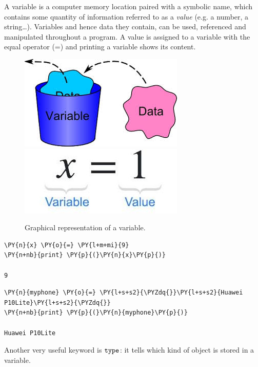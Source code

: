 A variable is a computer memory location paired with a symbolic name, which contains some quantity of information referred to as a \emph{value} (e.g. a number, a string\ldots). Variables and hence data they contain, can be used, referenced and manipulated throughout a program.
A value is assigned to a variable with the equal operator (=) and printing a variable shows its content. 

\begin{figure}[h]
\centering
\includegraphics[width=0.35\linewidth]{figures/var1.jpeg}\\
\includegraphics[width=0.35\linewidth]{figures/var2.jpeg}
\caption{Graphical representation of a variable.}
\end{figure}

\begin{codebox}[breakable, size=fbox, boxrule=1pt, pad at break*=1mm, colback=cellbackground, colframe=cellborder]
\begin{Verbatim}[commandchars=\\\{\}]
\PY{n}{x} \PY{o}{=} \PY{l+m+mi}{9}
\PY{n+nb}{print} \PY{p}{(}\PY{n}{x}\PY{p}{)}

9
\end{Verbatim}
\end{codebox}

\begin{codebox}[breakable, size=fbox, boxrule=1pt, pad at break*=1mm, colback=cellbackground, colframe=cellborder]
\begin{Verbatim}[commandchars=\\\{\}]
\PY{n}{myphone} \PY{o}{=} \PY{l+s+s2}{\PYZdq{}}\PY{l+s+s2}{Huawei P10Lite}\PY{l+s+s2}{\PYZdq{}}
\PY{n+nb}{print} \PY{p}{(}\PY{n}{myphone}\PY{p}{)}

Huawei P10Lite
\end{Verbatim}
\end{codebox}

Another very useful keyword is \(\tt{type}\): it tells which kind of object is stored in a variable.

